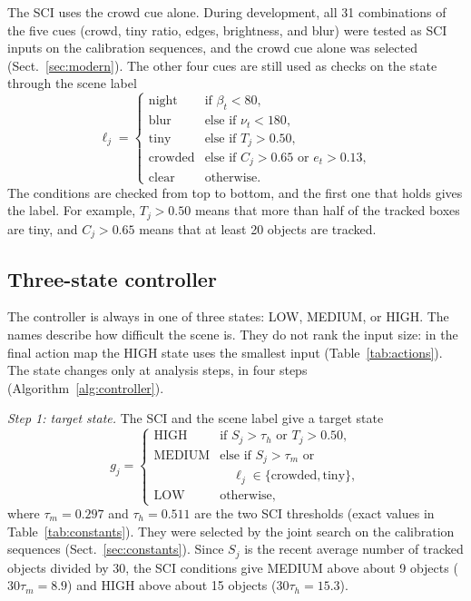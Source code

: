 \documentclass[pdflatex,sn-mathphys-num,iicol]{sn-jnl}
\begin{document}
The SCI uses the crowd cue alone. During development, all 31 combinations of
the five cues (crowd, tiny ratio, edges, brightness, and blur) were tested as
SCI inputs on the calibration sequences, and the crowd cue alone was selected
(Sect.~\ref{sec:modern}). The other four cues are still used as checks on the
state through the scene label
\begin{equation}
\ell_j=\begin{cases}
\text{night}   & \text{if } \beta_t<80,\\
\text{blur}    & \text{else if } \nu_t<180,\\
\text{tiny}    & \text{else if } T_j>0.50,\\
\text{crowded} & \text{else if } C_j>0.65 \text{ or } e_t>0.13,\\
\text{clear}   & \text{otherwise.}
\end{cases}
\label{eq:label}
\end{equation}
The conditions are checked from top to bottom, and the first one that holds
gives the label. For example, $T_j>0.50$ means that more than half of the
tracked boxes are tiny, and $C_j>0.65$ means that at least 20 objects are
tracked.

\subsection{Three-state controller}
The controller is always in one of three states: LOW, MEDIUM, or HIGH. The
names describe how difficult the scene is. They do not rank the input size:
in the final action map the HIGH state uses the smallest input
(Table~\ref{tab:actions}). The state changes only at analysis steps, in four
steps (Algorithm~\ref{alg:controller}).

\emph{Step 1: target state.} The SCI and the scene label give a target state
\begin{equation}
g_j=\begin{cases}
\text{HIGH}   & \text{if } S_j>\tau_h \text{ or } T_j>0.50,\\
\text{MEDIUM} & \text{else if } S_j>\tau_m \text{ or}\\
              & \quad \ell_j\in\{\text{crowded},\text{tiny}\},\\
\text{LOW}    & \text{otherwise,}
\end{cases}
\label{eq:target}
\end{equation}
where $\tau_m=0.297$ and $\tau_h=0.511$ are the two SCI thresholds (exact
values in Table~\ref{tab:constants}). They were selected by the joint search
on the calibration sequences (Sect.~\ref{sec:constants}). Since $S_j$ is the
recent average number of tracked objects divided by 30, the SCI conditions
give MEDIUM above about 9 objects ($30\tau_m=8.9$) and HIGH above about 15
objects ($30\tau_h=15.3$).
\end{document}

